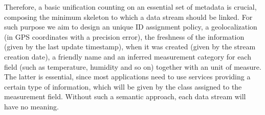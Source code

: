 Therefore, a basic unification counting on an essential set of metadata is crucial, composing the minimum skeleton to which a data stream should be linked.
For such purpose we aim to design an unique ID assignment policy, a geolocalization (in GPS coordinates with a precision error), the freshness of the information (given by the last update timestamp), when it was created (given by the stream creation date), a friendly name and an inferred measurement category for each field (such as temperature, humidity and so on) together with an unit of measure.
The latter is essential, since most applications need to use services providing a certain type of information, which will be given by the class assigned to the measurement field.
Without such a semantic approach, each data stream will have no meaning.

